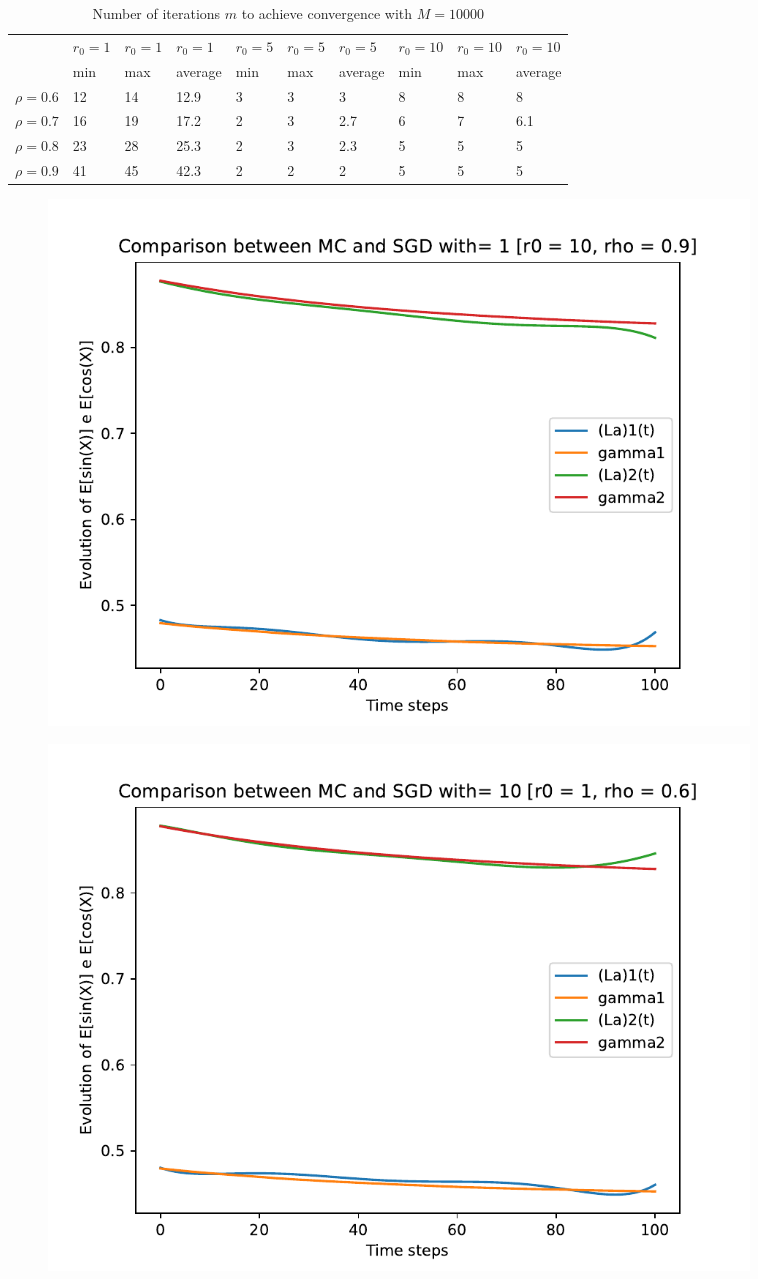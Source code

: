 \documentclass[a4paper,11pt,openright]{report}
\begin{document}
\begin{table}[H]
\centering
\addtolength{\leftskip}{-1.5cm}
\addtolength{\rightskip}{-1.5cm}
\begin{tabular}{|c|lllllllll|}
\hline
$ $ & $r_0 = 1$ & $r_0 = 1$ & $r_0 = 1$ & $r_0 = 5$ & $r_0 = 5$ & $r_0 = 5$ & $r_0 = 10$ & $r_0 = 10$ & $r_0 = 10$  \\
$ $ & min & max & average & min & max & average & min & max & average \\ 
\hline
$\rho = 0.6$ & 12 & 14 & 12.9 & 3 & 3 & 3 & 8 & 8 & 8 \\

$\rho = 0.7$ & 16 & 19 & 17.2 & 2 & 3 & 2.7 & 6 & 7 & 6.1\\

$\rho = 0.8$ & 23 & 28 & 25.3 & 2 & 3 & 2.3 & 5 & 5 & 5\\

$\rho = 0.9$ & 41 & 45 & 42.3 & 2 & 2 & 2 & 5 & 5 & 5\\
\hline
\end{tabular}
\caption{Number of iterations $m$ to achieve convergence with $M = 10000$}
\end{table}
\begin{figure}[H]
\centering
\includegraphics[width=0.9\textwidth]{images/graphics T = 1/n = 6, M = 1 sine and cosine.pdf}
\end{figure}
\begin{figure}[H]
\centering
\includegraphics[width=0.9\textwidth]{images/graphics T = 1/n = 6, M = 10 sine and cosine.pdf}
\end{figure}
\end{document}
